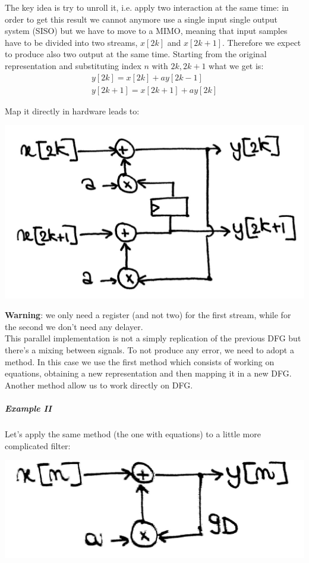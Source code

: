 The key idea is try to unroll it, i.e. apply two interaction at the same time: in order to get this result we cannot anymore use a single input single output system (SISO) but we have to move to a MIMO, meaning that input samples have to be divided into two streams, $x[2k]$ and $x[2k+1]$. Therefore we expect to produce also two output at the same time. Starting from the original representation and substituting index $n$ with $2k, 2k+1$ what we get is:
\begin{eqnarray}
y[2k]=x[2k]+ay[2k-1]\\
y[2k+1]=x[2k+1]+ay[2k]
\end{eqnarray}

Map it directly in hardware leads to:

\begin{center}
  \includegraphics[width=0.6\linewidth]{img/img1/21}
\end{center}

\textbf{Warning}: we only need a register (and not two) for the first stream, while for the second we don't need any delayer.\\
This parallel implementation is not a simply replication of the previous DFG but there's a mixing between signals. To not produce any error, we need to adopt a method. In this case we use the first method which consists of working on equations, obtaining a new representation and then mapping it in a new DFG. Another method allow us to work directly on DFG.

\subparagraph{Example II}

Let's apply the same method (the one with equations) to a little more complicated filter:

\begin{center}
  \includegraphics[width=0.6\linewidth]{img/img1/22}
\end{center}

